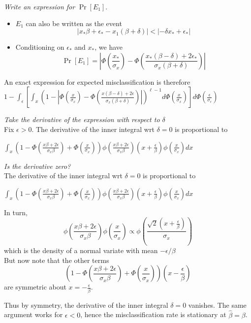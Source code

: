 \documentclass{beamer}
\begin{document}
\begin{frame}
\emph{Write an expression for }$\Pr[E_1]$.
\begin{itemize}
\item
$E_1$ can also be written as the event
\[
|x_* \beta + \epsilon_* - x_1 (\beta + \delta)| < |- \delta x_* + \epsilon_*|
\]
\item
Conditioning on $\epsilon_*$ and $x_*$, we have
\[
\Pr[E_1] = \left|
\Phi\left(\frac{x_*}{\sigma_x}\right)
 - 
\Phi\left(\frac{x_*(\beta - \delta) + 2\epsilon_*}{\sigma_x (\beta + \delta)}\right)
\right|
\]
\end{itemize}
\end{frame}

\begin{frame}
An exact expression for expected misclassification is therefore\\
$
1 - \int_\epsilon \left[\int_x  
\left(1 - 
\left|
\Phi\left(\frac{x}{\sigma_x}\right)
 - 
\Phi\left(\frac{x(\beta - \delta) + 2\epsilon}{\sigma_x (\beta + \delta)}\right)
\right|\right)^{\ell - 1}
 d\Phi(\frac{x}{\sigma_x}) \right]  d\Phi(\frac{\epsilon}{\sigma_\epsilon})
$
\end{frame}

\begin{frame}
\emph{Take the derivative of the expression with respect to $\delta$}\\
Fix $\epsilon > 0$.
The derivative of the inner integral wrt $\delta = 0$ is proportional to
\begin{center}
$\int_x (1 - \Phi(\frac{x\beta + 2\epsilon}{\sigma_x \beta}) + \Phi(\frac{x}{\sigma_x})) \phi(\frac{x\beta + 2\epsilon}{\sigma_x \beta})(x + \frac{\epsilon}{\beta}) \phi(\frac{x}{\sigma_x}) dx
$\end{center}
\end{frame}
\begin{frame}
\emph{Is the derivative zero?}\\
The derivative of the inner integral wrt $\delta = 0$ is proportional to
\begin{center}
$\int_x (1 - \Phi(\frac{x\beta + 2\epsilon}{\sigma_x \beta}) + \Phi(\frac{x}{\sigma_x})) \phi(\frac{x\beta + 2\epsilon}{\sigma_x \beta})(x + \frac{\epsilon}{\beta}) \phi(\frac{x}{\sigma_x}) dx
$\end{center}
In turn,
\[
\phi\left(\frac{x\beta + 2\epsilon}{\sigma_x \beta}\right)
\phi\left(\frac{x}{\sigma_x}\right) \propto 
\phi\left(\frac{\sqrt{2} (x + \frac{\epsilon}{\beta})}{\sigma_x}\right)
\]
which is the density of a normal variate with mean $-\epsilon/\beta$\\

But now note that the other terms
\[
\left(1 - \Phi\left(\frac{x\beta + 2\epsilon}{\sigma_x \beta}\right)
 + \Phi\left(\frac{x}{\sigma_x}\right)\right)
\left(x - \frac{\epsilon}{\beta}\right)
\]
are symmetric about $x = -\frac{\epsilon}{\beta}$.

Thus by symmetry, the derivative of the inner integral $\delta = 0$ vanishes.
The same argument works for $\epsilon < 0$, hence the misclassification rate is stationary at $\hat{\beta} = \beta$.
\end{frame}
\end{document}
